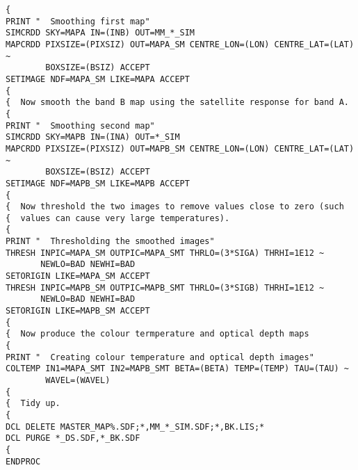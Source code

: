 \begin{verbatim}
{ 
PRINT "  Smoothing first map"
SIMCRDD SKY=MAPA IN=(INB) OUT=MM_*_SIM
MAPCRDD PIXSIZE=(PIXSIZ) OUT=MAPA_SM CENTRE_LON=(LON) CENTRE_LAT=(LAT) ~
        BOXSIZE=(BSIZ) ACCEPT
SETIMAGE NDF=MAPA_SM LIKE=MAPA ACCEPT
{
{  Now smooth the band B map using the satellite response for band A.
{ 
PRINT "  Smoothing second map"
SIMCRDD SKY=MAPB IN=(INA) OUT=*_SIM
MAPCRDD PIXSIZE=(PIXSIZ) OUT=MAPB_SM CENTRE_LON=(LON) CENTRE_LAT=(LAT) ~
        BOXSIZE=(BSIZ) ACCEPT
SETIMAGE NDF=MAPB_SM LIKE=MAPB ACCEPT
{
{  Now threshold the two images to remove values close to zero (such
{  values can cause very large temperatures).
{
PRINT "  Thresholding the smoothed images"
THRESH INPIC=MAPA_SM OUTPIC=MAPA_SMT THRLO=(3*SIGA) THRHI=1E12 ~
       NEWLO=BAD NEWHI=BAD 
SETORIGIN LIKE=MAPA_SM ACCEPT
THRESH INPIC=MAPB_SM OUTPIC=MAPB_SMT THRLO=(3*SIGB) THRHI=1E12 ~
       NEWLO=BAD NEWHI=BAD
SETORIGIN LIKE=MAPB_SM ACCEPT
{
{  Now produce the colour termperature and optical depth maps
{
PRINT "  Creating colour temperature and optical depth images"
COLTEMP IN1=MAPA_SMT IN2=MAPB_SMT BETA=(BETA) TEMP=(TEMP) TAU=(TAU) ~
        WAVEL=(WAVEL)
{
{  Tidy up.
{
DCL DELETE MASTER_MAP%.SDF;*,MM_*_SIM.SDF;*,BK.LIS;*
DCL PURGE *_DS.SDF,*_BK.SDF
{
ENDPROC
\end{verbatim}
\normalsize



